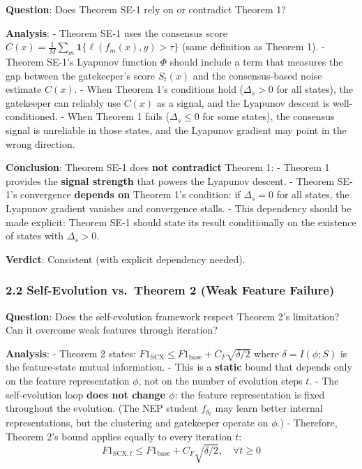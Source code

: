 \documentclass[
  12pt,
]{ctexart}
\begin{document}
\textbf{Question}: Does Theorem SE-1 rely on or contradict Theorem 1?

\textbf{Analysis}: - Theorem SE-1 uses the consensus score
\(C(x) = \frac{1}{M}\sum_m \mathbf{1}\{\ell(f_m(x), y) > \tau\}\) (same
definition as Theorem 1). - Theorem SE-1's Lyapunov function \(\Phi\)
should include a term that measures the gap between the gatekeeper's
score \(S_t(x)\) and the consensus-based noise estimate \(C(x)\). - When
Theorem 1's conditions hold (\(\Delta_s > 0\) for all states), the
gatekeeper can reliably use \(C(x)\) as a signal, and the Lyapunov
descent is well-conditioned. - When Theorem 1 fails (\(\Delta_s \leq 0\)
for some states), the consensus signal is unreliable in those states,
and the Lyapunov gradient may point in the wrong direction.

\textbf{Conclusion}: Theorem SE-1 does \textbf{not contradict} Theorem
1: - Theorem 1 provides the \textbf{signal strength} that powers the
Lyapunov descent. - Theorem SE-1's convergence \textbf{depends on}
Theorem 1's condition: if \(\Delta_s = 0\) for all states, the Lyapunov
gradient vanishes and convergence stalls. - This dependency should be
made explicit: Theorem SE-1 should state its result conditionally on the
existence of states with \(\Delta_s > 0\).

\textbf{Verdict}: Consistent (with explicit dependency needed).

\subsubsection{2.2 Self-Evolution vs.~Theorem 2 (Weak Feature
Failure)}\label{self-evolution-vs.-theorem-2-weak-feature-failure}

\textbf{Question}: Does the self-evolution framework respect Theorem 2's
limitation? Can it overcome weak features through iteration?

\textbf{Analysis}: - Theorem 2 states:
\(F1_{\text{SCX}} \leq F1_{\text{base}} + C_F\sqrt{\delta/2}\) where
\(\delta = I(\phi; S)\) is the feature-state mutual information. - This
is a \textbf{static} bound that depends only on the feature
representation \(\phi\), not on the number of evolution steps \(t\). -
The self-evolution loop \textbf{does not change \(\phi\)}: the feature
representation is fixed throughout the evolution. (The NEP student
\(f_{\theta_t}\) may learn better internal representations, but the
clustering and gatekeeper operate on \(\phi\).) - Therefore, Theorem 2's
bound applies equally to every iteration \(t\):
\[F1_{\text{SCX}, t} \leq F1_{\text{base}} + C_F\sqrt{\delta/2}, \quad \forall t \geq 0\]
\end{document}
